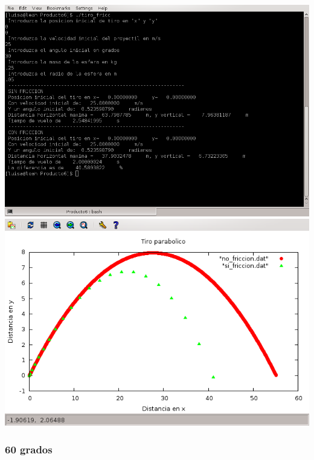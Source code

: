 \documentclass[10pt]{article}
\begin{document}
\includegraphics[scale=0.6]{30grad.png}
\\
\includegraphics[scale=0.6]{30graf.png}

\newpage

\subsubsection{60 grados}
\end{document}
